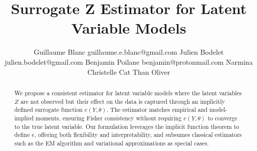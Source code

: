 \documentclass[twoside,11pt]{article}
\begin{document}
\title{Surrogate Z Estimator for Latent Variable Models}

\author{\name Guillaume Blanc \email guillaume.e.blanc@gmail.com
  \AND
  \name Julien Bodelet \email julien.bodelet@gmail.com
  \AND
  \name Benjamin Poilane \email benjamin@protonmail.com
  \AND
  \name Narmina Christelle Cat Than Oliver
}


\maketitle

\begin{abstract}
We propose a consistent estimator for latent variable models where the latent variables \( Z \) are not observed but their effect on the data is captured through an implicitly defined surrogate function \( e(Y, \theta) \). The estimator matches empirical and model-implied moments, ensuring Fisher consistency without requiring \( e(Y, \theta) \) to converge to the true latent variable. Our formulation leverages the implicit function theorem to define \( e \), offering both flexibility and interpretability, and subsumes classical estimators such as the EM algorithm and variational approximations as special cases.
\end{abstract}



\newpage

\listoftodos

\newpage
\end{document}
